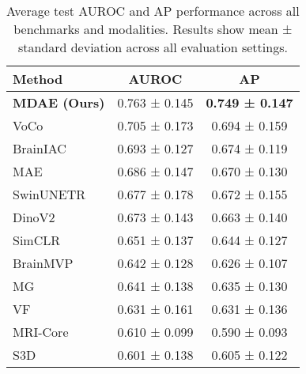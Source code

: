 \begin{table}[ht]
\centering
\caption{Average test AUROC and AP performance across all benchmarks and modalities. Results show mean ± standard deviation across all evaluation settings.}
\label{tab:comprehensive_metrics}
\begin{tabular}{lcc}
\toprule
Method & AUROC & AP \\
\midrule
\textbf{MDAE (Ours)} & 0.763 ± 0.145 & \textbf{0.749 ± 0.147} \\
VoCo & 0.705 ± 0.173 & 0.694 ± 0.159 \\
BrainIAC & 0.693 ± 0.127 & 0.674 ± 0.119 \\
MAE & 0.686 ± 0.147 & 0.670 ± 0.130 \\
SwinUNETR & 0.677 ± 0.178 & 0.672 ± 0.155 \\
DinoV2 & 0.673 ± 0.143 & 0.663 ± 0.140 \\
SimCLR & 0.651 ± 0.137 & 0.644 ± 0.127 \\
BrainMVP & 0.642 ± 0.128 & 0.626 ± 0.107 \\
MG & 0.641 ± 0.138 & 0.635 ± 0.130 \\
VF & 0.631 ± 0.161 & 0.631 ± 0.136 \\
MRI-Core & 0.610 ± 0.099 & 0.590 ± 0.093 \\
S3D & 0.601 ± 0.138 & 0.605 ± 0.122 \\
\bottomrule
\end{tabular}
\end{table}
